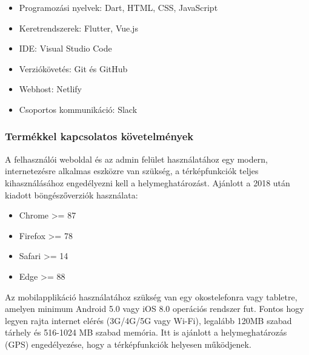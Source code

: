 \begin{itemize}
  \item Programozási nyelvek: Dart, HTML, CSS, JavaScript
  \item Keretrendszerek: Flutter, Vue.js
  \item IDE: Visual Studio Code
  \item Verziókövetés: Git és GitHub
  \item Webhost: Netlify
  \item Csoportos kommunikáció: Slack
\end{itemize}

\subsubsection{Termékkel kapcsolatos követelmények}

A felhasználói weboldal és az admin felület használatához egy modern, internetezésre alkalmas eszközre van szükség, a térképfunkciók teljes kihasználásához engedélyezni kell a helymeghatározást. Ajánlott a 2018 után kiadott böngészőverziók használata:
\begin{itemize}
  \item Chrome >= 87
  \item Firefox >= 78
  \item Safari >= 14
  \item Edge >= 88
\end{itemize}

Az mobilapplikáció használatához szükség van egy okostelefonra vagy tabletre,
amelyen minimum Android 5.0 vagy iOS 8.0 operációs rendszer fut. Fontos hogy legyen
rajta internet elérés (3G/4G/5G vagy Wi-Fi), legalább 120MB szabad tárhely és 516-1024 MB szabad memória. Itt is ajánlott a helymeghatározás (GPS) engedélyezése, hogy a térképfunkciók helyesen működjenek.
